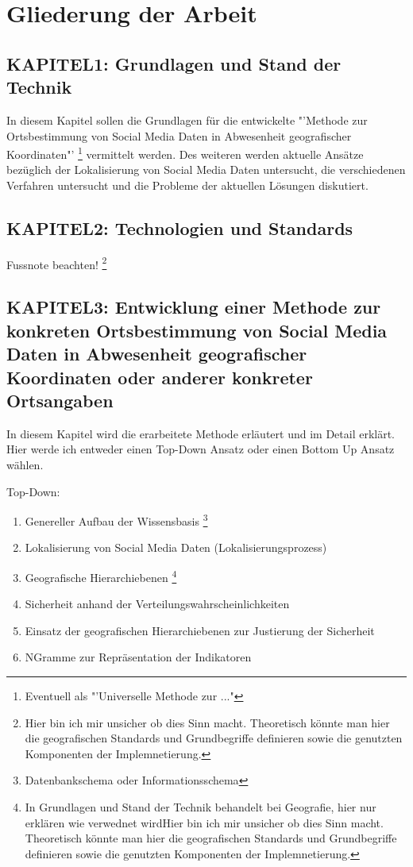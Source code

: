 	\section{Gliederung der Arbeit}

		\subsection*{KAPITEL1: Grundlagen und Stand der Technik}
			In diesem Kapitel sollen die Grundlagen für die entwickelte "'Methode zur Ortsbestimmung von Social Media Daten in Abwesenheit geografischer Koordinaten"' \footnote{Eventuell als "'Universelle Methode zur ..."} vermittelt werden. 
			Des weiteren werden aktuelle Ansätze bezüglich der Lokalisierung von Social Media Daten untersucht, die verschiedenen Verfahren untersucht und die Probleme der aktuellen Lösungen diskutiert.

		\subsection*{KAPITEL2: Technologien und Standards}
		Fussnote beachten!
			\footnote{Hier bin ich mir unsicher ob dies Sinn macht. 
			Theoretisch könnte man hier die geografischen Standards und Grundbegriffe definieren sowie die genutzten Komponenten der Implemnetierung.} 

		\subsection*{KAPITEL3: Entwicklung einer Methode zur konkreten Ortsbestimmung von Social Media Daten in Abwesenheit geografischer Koordinaten oder anderer konkreter Ortsangaben}
			In diesem Kapitel wird die erarbeitete Methode erläutert und im Detail erklärt. 
			Hier werde ich entweder einen Top-Down Ansatz oder einen Bottom Up Ansatz wählen.

			Top-Down:
			\begin{enumerate}
				\item Genereller Aufbau der Wissensbasis \footnote{Datenbankschema oder Informationsschema} 
				\item Lokalisierung von Social Media Daten (Lokalisierungsprozess) 
				\item Geografische Hierarchiebenen \footnote{In Grundlagen und Stand der Technik behandelt bei Geografie, hier nur erklären wie verwednet wirdHier bin ich mir unsicher ob dies Sinn macht. 
			Theoretisch könnte man hier die geografischen Standards und Grundbegriffe definieren sowie die genutzten Komponenten der Implemnetierung.}
				\item Sicherheit anhand der Verteilungswahrscheinlichkeiten
				\item Einsatz der geografischen Hierarchiebenen zur Justierung der Sicherheit    
				\item NGramme zur Repräsentation der Indikatoren
			\end{enumerate}

